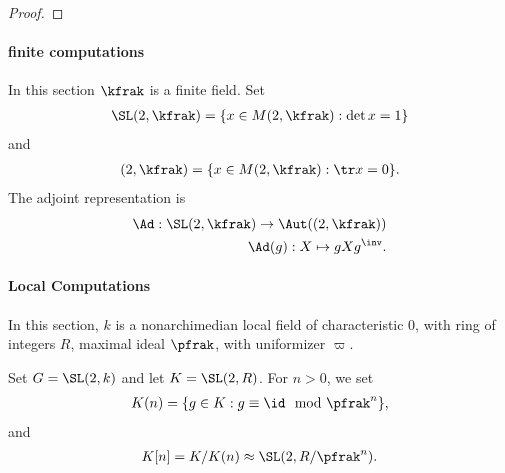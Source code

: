 \begin{proof}












\end{proof}

\paragraph{finite computations}
In this section $\kfrak$ is a finite field. Set
\begin{align*}
    \SL(2,\kfrak) = \{ x \in M(2,\kfrak) : \det x =1 \}
\end{align*}
and
\begin{align*}
    \sl(2,\kfrak) = \{ x \in M(2,\kfrak) : \tr x = 0 \}.
\end{align*}
The adjoint representation is
\begin{align*}
    \Ad : \SL(2,\kfrak) \to \Aut(\sl(2,\kfrak)) \\
    \Ad(g):  X \mapsto  g X g^\inv.
\end{align*}

\paragraph{Local Computations}
In this section, $k$ is a nonarchimedian local field of characteristic $0$, with ring of integers $R$, maximal ideal $\pfrak$, with uniformizer $\varpi$.

Set $G = \SL(2,k)$ and let $K = \SL(2,R)$. For $n>0$, we set
\begin{align*}
    K(n) = \{ g \in K : g \equiv \id \mod \pfrak^n\},
\end{align*}
and
\begin{align*}
    K[n] = K/K(n) \approx \SL(2,R/\pfrak^n).
\end{align*}
\cite{leiningerLengthEigenvalueEquivalence2007}
\cite{voightQuaternionAlgebras2021}
